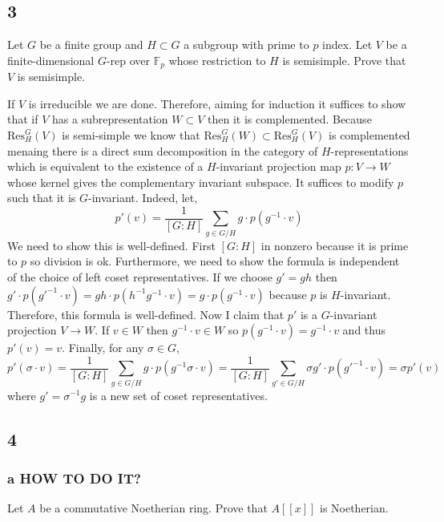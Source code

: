\documentclass[12pt]{article}
\begin{document}
\subsection{3}

\begin{exercise}
Let $G$ be a finite group and $H \subset G$ a subgroup with prime to $p$ index. Let $V$ be a finite-dimensional $G$-rep over $\mathbb{F}_p$ whose restriction to $H$ is semisimple. Prove that $V$ is semisimple.
\end{exercise}

If $V$ is irreducible we are done. Therefore, aiming for induction it suffices to show that if $V$ has a subrepresentation $W \subset V$ then it is complemented. Because $\mathrm{Res}^G_H(V)$ is semi-simple we know that $\mathrm{Res}^G_H(W) \subset \mathrm{Res}^G_H(V)$ is complemented menaing there is a direct sum decomposition in the category of $H$-representations which is equivalent to the existence of a $H$-invariant projection map $p : V \to W$ whose kernel gives the complementary invariant subspace. It suffices to modify $p$ such that it is $G$-invariant. Indeed, let,
\[ p'(v) = \frac{1}{[G : H]} \sum_{g \in G / H} g \cdot p(g^{-1} \cdot v) \]
We need to show this is well-defined. First $[G : H]$ in nonzero because it is prime to $p$ so division is ok. Furthermore, we need to show the formula is independent of the choice of left coset representatives. If we choose $g' = g h$ then $g' \cdot p(g'^{-1} \cdot v) = g h \cdot p(h^{-1} g^{-1} \cdot v) = g \cdot p(g^{-1} \cdot v)$ because $p$ is $H$-invariant. Therefore, this formula is well-defined. Now I claim that $p'$ is a $G$-invariant projection $V \to W$. If $v \in W$ then $g^{-1} \cdot v \in W$ so $p(g^{-1} \cdot v) = g^{-1} \cdot v$ and thus $p'(v) = v$. Finally, for any $\sigma \in G$,
\[ p'(\sigma \cdot v) = \frac{1}{[G : H]} \sum_{g \in G / H} g \cdot p(g^{-1} \sigma \cdot v) = \frac{1}{[G : H]} \sum_{g' \in G / H} \sigma g' \cdot p(g'^{-1} \cdot v) = \sigma p'(v) \]
where $g' = \sigma^{-1} g$ is a new set of coset representatives.

\subsection{4}

\subsubsection{a HOW TO DO IT?}

\begin{exercise}
Let $A$ be a commutative Noetherian ring. Prove that $A[[x]]$ is Noetherian. 
\end{exercise}
\end{document}
